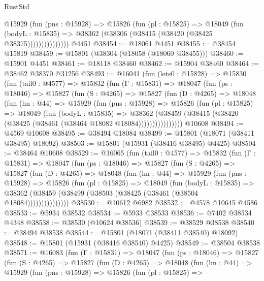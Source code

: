 \begin{lexlean}{RustStd}
\begin{coremodule}
                  @15929
                    (fun (pns : @15928) =>
                    @15826
                      (fun (pl : @15825) =>
                      @18049
                        (fun (bodyL : @15835) =>
                        @38362 (@38306 (@38415 (@38420 (@38425 @38375)))))))))))))))
    @4451
@38454 := @18061 @4451
@38455 := @38454 @15819
@38459 := @15801 (@38304 (@18058 (@18060 @38455)))
@38460 := @15901 @4451
@38461 := @18118 @38460
@38462 := @15904 @38460
@38464 := @38462 @38370 @31256
@38493 := @16041
    (fun (lets0 : @15828) =>
    @15830
      (fun (tail0 : @4577) =>
      @15832
        (fun (Γ : @15831) =>
        @18047
          (fun (ps : @18046) =>
          @15827
            (fun (S : @4265) =>
            @15827
              (fun (D : @4265) =>
              @18048
                (fun (hn : @44) =>
                @15929
                  (fun (pns : @15928) =>
                  @15826
                    (fun (pl : @15825) =>
                    @18049
                      (fun (bodyL : @15835) =>
                      @38362
                        (@38459
                          (@38415 (@38420 (@38425 (@38461 (@38464 @18082 @18084))))))))))))))))
    @10608
@38494 := @4569 @10608
@38495 := @38494 @18084
@38499 := @15801 (@18071 (@38411 @38495) @18092)
@38503 := @15801 (@15931 (@38416 @38495) @4425)
@38504 := @38464 @10608
@38529 := @16065
    (fun (tail0 : @4577) =>
    @15832
      (fun (Γ : @15831) =>
      @18047
        (fun (ps : @18046) =>
        @15827
          (fun (S : @4265) =>
          @15827
            (fun (D : @4265) =>
            @18048
              (fun (hn : @44) =>
              @15929
                (fun (pns : @15928) =>
                @15826
                  (fun (pl : @15825) =>
                  @18049
                    (fun (bodyL : @15835) =>
                    @38362 (@38459 (@38499 (@38503 (@38425 (@38461 (@38504 @18084)))))))))))))))
@38530 := @10612 @6982
@38532 := @4578 @10645 @4586
@38533 := @5934 @38532
@38534 := @5933 @38533
@38536 := @7402 @38534 @4348
@38538 := @38530 (@10624 @38536)
@38539 := @38529 @38538
@38540 := @38494 @38538
@38544 := @15801 (@18071 (@38411 @38540) @18092)
@38548 := @15801 (@15931 (@38416 @38540) @4425)
@38549 := @38504 @38538
@38571 := @16083
    (fun (Γ : @15831) =>
    @18047
      (fun (ps : @18046) =>
      @15827
        (fun (S : @4265) =>
        @15827
          (fun (D : @4265) =>
          @18048
            (fun (hn : @44) =>
            @15929
              (fun (pns : @15928) =>
              @15826
                (fun (pl : @15825) =>

\end{coremodule}
\end{lexlean}
